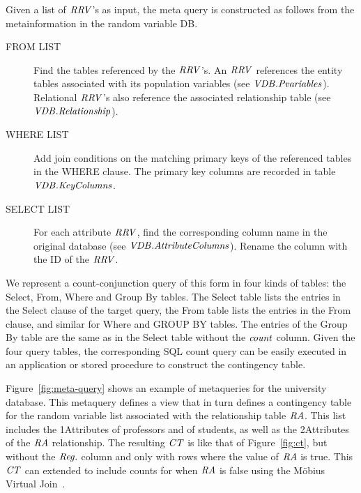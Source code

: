 \documentclass{acm_proc_article-sp}
\begin{document}
 Given a list of $\it{RRV}$'s as input, the meta query is constructed as follows from the metainformation in the random variable DB.  
\begin{description}
\item[FROM LIST] Find the tables referenced by the $\it{RRV}$'s. An $\it{RRV}$ references the entity tables associated with its population variables (see $\it{VDB}.Pvariables$). Relational $\it{RRV}$'s also reference the associated relationship table (see $\it{VDB}.Relationship$). 
\item[WHERE LIST] Add join conditions on the matching primary keys of the referenced tables in the WHERE clause. The primary key columns are recorded in table $\it{VDB}.KeyColumns$. 
\item[SELECT LIST] For each attribute $\it{RRV}$, find the corresponding column name in the original database (see $\it{VDB}.AttributeColumns$). Rename the column with the ID of the $\it{RRV}$.
\end{description}

We represent a count-conjunction query of this form in 
four kinds of tables: the Select, From, Where and Group By tables. 
The Select table lists the entries in the Select clause of the target query, the From table lists the entries in the From clause, and similar for Where and GROUP BY tables. The entries of the Group By table are the same as in the Select table without the $\it{count}$ column.
Given the four query tables, the corresponding SQL count query can be easily executed in an application or stored procedure to construct the contingency table.


Figure~\ref{fig:meta-query} shows an example of metaqueries for the university database. This metaquery defines a view that in turn defines a contingency table for the random variable list associated with the relationship table $\mathit{RA}$. This list includes the 1Attributes of professors and of students, as well as the 2Attributes of the $\mathit{RA}$ relationship. The resulting $\it{CT}$ is like that of Figure~\ref{fig:ct}, but without the $\it{Reg.}$ column and only with rows where the value of $\mathit{RA}$ is true. This $\it{CT}$ can extended to include counts for when $\mathit{RA}$ is false using the M\"obius Virtual Join~\cite{Schulte2014}.
\end{document}
